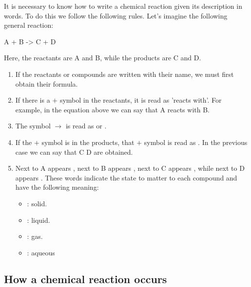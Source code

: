 It is necessary to know how to write a chemical reaction given its description in words.
To do this we follow the following rules.
Let's imagine the following general reaction:
\begin{reaction*}
    A \gas{} + B \sld{} -> C \lqd{} + D \aq{}
\end{reaction*}
Here, the reactants are A and B, while the products are C and D.
\begin{enumerate}[label=\numberballmDarkTeal]
        \item If the reactants or compounds are written with their name, we must first obtain their formula.
        \item If there is a \( + \) symbol in the reactants, it is read as 'reacts with'. For example, in the equation above we can say that A reacts with B.
        \item The symbol \( \rightarrow \) is read as  or .
        \item If the \( + \) symbol is in the products, that \( + \) symbol is read as .
        In the previous case we can say that C  D are obtained.
        \item Next to A appears \gas{}, next to B appears \sld{}, next to C appears \lqd{}, while next to D appears \aq{}. These words indicate the state to matter to each compound and have the following meaning:
        \begin{itemize}
            \item \sld{}: solid.
            \item \lqd{}: liquid.
            \item \gas{}: gas.
            \item \aq{}: aqueous
        \end{itemize}
\end{enumerate}

\subsection{How a chemical reaction occurs}

